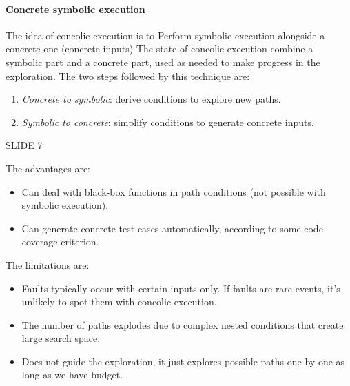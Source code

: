 \paragraph*{Concrete symbolic execution}
The idea of concolic execution is to Perform symbolic execution alongside a concrete one (concrete inputs)
The state of concolic execution combine a symbolic part and a concrete part, used as needed to make progress in the exploration. 
The two steps followed by this technique are: 
\begin{enumerate}
    \item \textit{Concrete to symbolic}: derive conditions to explore new paths. 
    \item \textit{Symbolic to concrete}: simplify conditions to generate concrete inputs. 
\end{enumerate}
\begin{example}
    SLIDE 7
\end{example}
The advantages are: 
\begin{itemize}
    \item Can deal with black-box functions in path conditions (not possible with symbolic execution). 
    \item Can generate concrete test cases automatically, according to some code coverage criterion. 
\end{itemize} 
The limitations are: 
\begin{itemize}
    \item Faults typically occur with certain inputs only. 
        If faults are rare events, it's unlikely to spot them with concolic execution. 
    \item The number of paths explodes due to complex nested conditions that create large search space. 
    \item Does not guide the exploration, it just explores possible paths one by one as long as we have budget. 
\end{itemize}





















